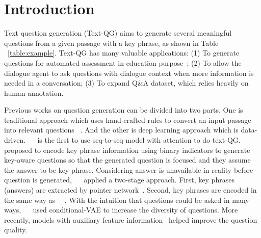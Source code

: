 \section{Introduction}

Text question generation (Text-QG) aims to generate several meaningful questions from a given passage with a key phrase, as shown in Table ~\ref{table:example}. Text-QG has many valuable applications: (1) To generate questions for automated assessment in education purpose~\cite{HeilmanS10}; (2) To allow the dialogue agent to ask questions with dialogue context when more information is needed in a conversation; (3) To expand Q\&A dataset, which relies heavily on human-annotation.

Previous works on question generation can be divided into two parts. One is traditional approach which uses hand-crafted rules to convert an input passage into relevant questions ~\cite{HeilmanS10,chali2015towards}. And the other is deep learning approach which is data-driven. ~\citeauthor{du2017learning}~ is the first to use seq-to-seq model with attention to do text-QG. ~\citeauthor{zhou2017neural}~ proposed to encode 
key phrase information using binary indicators to generate 
key-aware questions so that the generated question is focused and they assume the answer to be key phrase. Considering answer is unavailable in reality before question is generated, ~\citeauthor{SubramanianWYT17}~ applied a two-stage approach. First, key phrases (answers) are extracted by pointer network~\cite{ptrnet}. Second, key phrases are encoded in the same way as ~\citeauthor{zhou2017neural}~. With the intuition that questions could be asked in many ways, ~\citeauthor{Yao2018vae}~ used conditional-VAE to increase the diversity of questions. More recently, models with auxiliary feature information~\cite{HarrisonW18} helped improve the question quality. 

